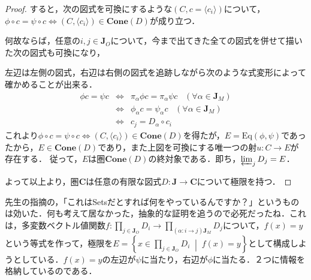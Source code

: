 \documentclass[uplatex, 12pt, dvipdfmx]{jsarticle}
\begin{document}
\begin{proof}
    すると，次の図式を可換にするような$(C,c=\langle c_i\rangle)$について，$\phi\circ c=\psi\circ c\Leftrightarrow (C,\langle c_i\rangle)\in\mathbf{Cone}(D)$が成り立つ．
    \begin{center}
    \end{center}
    何故ならば，任意の$i,j\in\mathbf{J}_O$について，今まで出てきた全ての図式を併せて描いた次の図式も可換になり，
    \begin{center}
    \end{center}
    左辺は左側の図式，右辺は右側の図式を追跡しながら次のような式変形によって確かめることが出来る．
    \begin{eqnarray*}
        \phi c = \psi c &\Leftrightarrow& \pi_\alpha\phi c =\pi_\alpha\psi c \;\;\;(\forall\alpha\in\mathbf{J}_M ) \\
        &\Leftrightarrow& \phi_\alpha c =\psi_\alpha c \;\;\;(\forall\alpha\in\mathbf{J}_M ) \\
        &\Leftrightarrow& c_j = D_\alpha\circ c_i
    \end{eqnarray*}
    これより$\phi\circ c=\psi\circ c\Leftrightarrow (C,\langle c_i\rangle)\in\mathbf{Cone}(D)$を得たが，$E=\mathrm{Eq}(\phi,\psi)$であったから，$E\in\mathbf{Cone}(D)$であり，また上図を可換にする唯一つの射$u:C\to E$が存在する．
    従って，$E$は圏$\mathbf{Cone}(D)$の終対象である．即ち，$\varprojlim_{j}D_j=E$．

    よって以上より，圏$\mathbf{C}$は任意の有限な図式$D:\mathbf{J}\to\mathbf{C}$について極限を持つ．
\end{proof}
\begin{remark*}
    先生の指摘の，「これはSetsだとすれば何をやっているんですか？」というものは効いた．何も考えて居なかった，抽象的な証明を追うので必死だったね．これは，多変数ベクトル値関数$f:\prod_{j\in\mathbf{J}_O}D_i\to\prod_{(\alpha:i\to j)\mathbf{J}_M}D_j$について，$f(x)=y$という等式を作って，極限を$E=\left\{x\in\prod_{j\in\mathbf{J}_O}D_i\;\middle|\;f(x)=y\right\}$として構成しようとしている．$f(x)=y$の左辺が$\psi$に当たり，右辺が$\phi$に当たる．２つに情報を格納しているのである．
\end{remark*}
\end{document}
